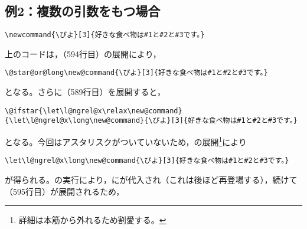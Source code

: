 \documentclass[autodetect-engine,dvipdfmx]{jsarticle}
\begin{document}
\subsection{例2：複数の引数をもつ場合}
\texsource
\begin{lstlisting}
\newcommand{\ぴよ}[3]{好きな食べ物は#1と#2と#3です。}
\end{lstlisting}
上のコードは，（594行目）の展開により，
\begin{lstlisting}
\@star@or@long\new@command{\ぴよ}[3]{好きな食べ物は#1と#2と#3です。}
\end{lstlisting}

となる。さらに（589行目）を展開すると，
\begin{lstlisting}
\@ifstar{\let\l@ngrel@x\relax\new@command}{\let\l@ngrel@x\long\new@command}{\ぴよ}[3]{好きな食べ物は#1と#2と#3です。}
\end{lstlisting}
となる。今回はアスタリスクがついていないため，の展開\footnote{詳細は本筋から外れるため割愛する。}により

\begin{lstlisting}
\let\l@ngrel@x\long\new@command{\ぴよ}[3]{好きな食べ物は#1と#2と#3です。}
\end{lstlisting}

が得られる。の実行により，にが代入され（これは後ほど再登場する），続けて（595行目）が展開されるため，
\end{document}
